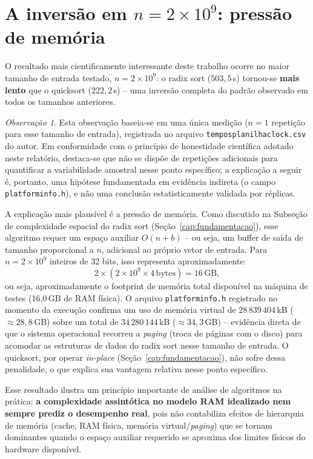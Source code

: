\documentclass[
	12pt,
	oneside,
	a4paper,
	chapter=TITLE,
	section=TITLE,
	subsection=TITLE,
	subsubsection=TITLE,
	english,
	brazil
]{abntex2}
\theoremstyle{plain}
\theoremstyle{remark}
\newtheorem*{observacao}{Observação}
\renewcommand{\_}{\underscoreoriginal\allowbreak}
\begin{document}
\section{A inversão em $n = 2 \times 10^{9}$: pressão de memória}
\label{sec:inversao}

O resultado mais cientificamente interessante deste trabalho ocorre no maior tamanho de entrada testado, $n = 2\times10^{9}$: o radix sort ($503{,}5$\,s) tornou-se \textbf{mais lento} que o quicksort ($222{,}2$\,s) -- uma inversão completa do padrão observado em todos os tamanhos anteriores.

\begin{observacao}
Esta observação baseia-se em uma única medição ($n=1$ repetição para esse tamanho de entrada), registrada no arquivo \texttt{tempos\_planilha\_clock.csv} do autor. Em conformidade com o princípio de honestidade científica adotado neste relatório, destaca-se que não se dispõe de repetições adicionais para quantificar a variabilidade amostral nesse ponto específico; a explicação a seguir é, portanto, uma hipótese fundamentada em evidência indireta (o campo \texttt{platforminfo.h}), e não uma conclusão estatisticamente validada por réplicas.
\end{observacao}

A explicação mais plausível é a pressão de memória. Como discutido na Subseção de complexidade espacial do radix sort (Seção~\ref{cap:fundamentacao}), esse algoritmo requer um espaço auxiliar $O(n+b)$ -- ou seja, um buffer de saída de tamanho proporcional a $n$, adicional ao próprio vetor de entrada. Para $n = 2\times10^{9}$ inteiros de 32 bits, isso representa aproximadamente:
\[
2 \times (2\times10^{9} \times 4\,\text{bytes}) = 16\,\text{GB},
\]
ou seja, aproximadamente o footprint de memória total disponível na máquina de testes (16{,}0\,GB de RAM física). O arquivo \texttt{platforminfo.h} registrado no momento da execução confirma um uso de memória virtual de $28\,839\,404$\,kB ($\approx 28{,}8$\,GB) sobre um total de $34\,280\,144$\,kB ($\approx 34{,}3$\,GB) -- evidência direta de que o sistema operacional recorreu a \emph{paging} (troca de páginas com o disco) para acomodar as estruturas de dados do radix sort nesse tamanho de entrada. O quicksort, por operar \emph{in-place} (Seção~\ref{cap:fundamentacao}), não sofre dessa penalidade, o que explica sua vantagem relativa nesse ponto específico.

Esse resultado ilustra um princípio importante de análise de algoritmos na prática: \textbf{a complexidade assintótica no modelo RAM idealizado nem sempre prediz o desempenho real}, pois não contabiliza efeitos de hierarquia de memória (cache, RAM física, memória virtual/\emph{paging}) que se tornam dominantes quando o espaço auxiliar requerido se aproxima dos limites físicos do hardware disponível.
\end{document}
